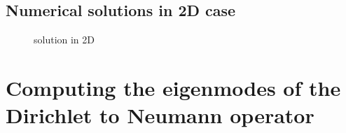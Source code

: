 \subsection{Numerical solutions in 2D case}
\label{sec:numerical-solutions}
\begin{figure}[htbp]
  \centering
  \caption{solution in 2D}
  \label{fig:original}
\end{figure}


\section{Computing the eigenmodes of the Dirichlet to Neumann operator}
\label{sec:comp-eigenm-dirichl}





